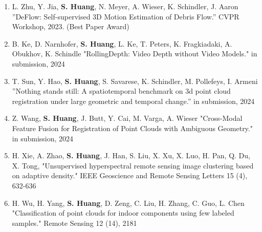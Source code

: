 \begin{enumerate}
    \item L. Zhu, Y. Jia, \textbf{S. Huang}, N. Meyer, A. Wieser, K. Schindler, J. Aaron ”DeFlow: Self-supervised 3D Motion Estimation of Debris Flow.” CVPR Workshop, 2023. (Best Paper Award)
    \item B. Ke, D. Narnhofer, \textbf{S. Huang}, L. Ke, T. Peters, K. Fragkiadaki, A. Obukhov, K. Schindle "RollingDepth: Video Depth without Video Models." in submission, 2024
    \item T. Sun, Y. Hao, \textbf{S. Huang}, S. Savarese, K. Schindler, M. Pollefeys, I. Armeni ”Nothing stands still: A spatiotemporal benchmark on 3d point cloud registration under large geometric and temporal change.” in submission, 2024
    \item Z. Wang, \textbf{S. Huang}, J. Butt, Y. Cai, M. Varga, A. Wieser "Cross-Modal Feature Fusion for Registration of Point Clouds with Ambiguous Geometry." in submission, 2024
    \item H. Xie, A. Zhao, \textbf{S. Huang}, J. Han, S. Liu, X. Xu, X. Luo, H. Pan, Q. Du, X. Tong, "Unsupervised hyperspectral remote sensing image clustering based on adaptive density." IEEE Geoscience and Remote Sensing Letters 15 (4), 632-636
    \item H. Wu, H. Yang, \textbf{S. Huang}, D. Zeng, C. Liu, H. Zhang, C. Guo, L. Chen "Classification of point clouds for indoor components using few labeled samples." Remote Sensing 12 (14), 2181
\end{enumerate}